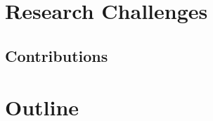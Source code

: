 \section{Research Challenges}
\label{sec:chall}



\subsection{Contributions}



\section{Outline}
\label{sec:outline}

